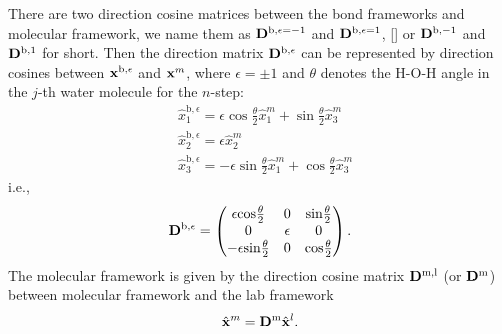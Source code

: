 There are two direction cosine matrices between the bond frameworks and molecular framework,
we name them as ${\bf D}^{\text{b},\epsilon=-1}$ and  ${\bf D}^{\text{b},\epsilon=1}$, [\cite{Khatib2017}]
or ${\bf D}^{\text{b},-1}$ and  ${\bf D}^{\text{b},1}$ for short. 
Then the direction matrix ${\bf D}^{\text{b},\epsilon} $ can be represented by direction cosines between ${\bf x}^{\text{b},\epsilon}$ and ${\bf x}^m$, 
where $\epsilon=\pm 1$ and $\theta$ denotes the H-O-H angle in the $j$-th water molecule for the $n$-step:
\begin{subequations}
\begin{align}
  &\hat x^{\text{b},\epsilon}_1 = \epsilon \cos\frac{\theta}{2} \hat x^m_1 +  \sin\frac{\theta}{2} \hat x^m_3 \\
  &\hat x^{\text{b},\epsilon}_2 = \epsilon \hat x^m_2 \\
  &\hat x^{\text{b},\epsilon}_3 = -\epsilon \sin\frac{\theta}{2} \hat x^m_1 + \cos\frac{\theta}{2} \hat x^m_3
\end{align}
\end{subequations}
i.e., 
\begin{equation}
  {\bf D}^{\text{b},\epsilon} =\left(
  \begin{matrix}
    \epsilon\text{cos}\frac{\theta}{2} &  0  & \text{sin}\frac{\theta}{2}\\
    0 & \epsilon & 0\\
    -\epsilon\text{sin}\frac{\theta}{2} & 0 & \text{cos}\frac{\theta}{2}
  \end{matrix}
  \right).
\end{equation}
  The molecular framework is given by the direction cosine matrix ${\bf D}^\text{m,l}$ (or ${\bf D}^\text{m}$) between molecular framework  and the lab framework
%
\begin{subequations}
\begin{align}
  \hat {\bf x}^m ={\bf D}^\text{m} \hat{\bf x}^l.
\end{align}
\end{subequations}

